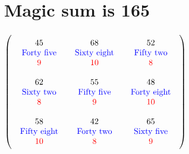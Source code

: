 \documentclass{article}
\begin{document}
\vspace{2em} 
\section{Magic sum is 165}$ \left( \begin{array}{ccc}
\begin{array}{c}
\rule{0pt}{1.5em}45 \\ 
\text{\color{blue}Forty five} \\ 
\color{red}9 \vspace{.5em} 
\end{array} & \begin{array}{c}
\rule{0pt}{1.5em}68 \\ 
\text{\color{blue}Sixty eight} \\ 
\color{red}10 \vspace{.5em} 
\end{array} & \begin{array}{c}
\rule{0pt}{1.5em}52 \\ 
\text{\color{blue}Fifty two} \\ 
\color{red}8 \vspace{.5em} 
\end{array}\\ 
\begin{array}{c}
\rule{0pt}{1.5em}62 \\ 
\text{\color{blue}Sixty two} \\ 
\color{red}8 \vspace{.5em} 
\end{array} & \begin{array}{c}
\rule{0pt}{1.5em}55 \\ 
\text{\color{blue}Fifty five} \\ 
\color{red}9 \vspace{.5em} 
\end{array} & \begin{array}{c}
\rule{0pt}{1.5em}48 \\ 
\text{\color{blue}Forty eight} \\ 
\color{red}10 \vspace{.5em} 
\end{array}\\ 
\begin{array}{c}
\rule{0pt}{1.5em}58 \\ 
\text{\color{blue}Fifty eight} \\ 
\color{red}10 \vspace{.5em} 
\end{array} & \begin{array}{c}
\rule{0pt}{1.5em}42 \\ 
\text{\color{blue}Forty two} \\ 
\color{red}8 \vspace{.5em} 
\end{array} & \begin{array}{c}
\rule{0pt}{1.5em}65 \\ 
\text{\color{blue}Sixty five} \\ 
\color{red}9 \vspace{.5em} 
\end{array}\end{array} \right) $
\end{document}
